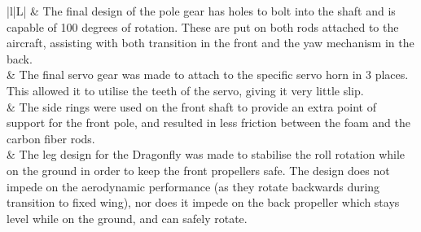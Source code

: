 \begin{table}[!htbp]
	\centering
	\caption{Gear, Legs and Front Ring Designs}
	\begin{tabulary}{\textwidth}{|l|L|}
		\hline
		\centering
		 &
		\vspace{30pt} The final design of the pole gear has holes to bolt into the shaft and is capable of 100 degrees of rotation. These are put on both rods attached to the aircraft, assisting with both transition in the front and the yaw mechanism in the back.  \\ 
		\hline 
		\centering
		 &
		\vspace{30pt} The final servo gear was made to attach to the specific servo horn in 3 places. This allowed it to utilise the teeth of the servo, giving it very little slip.\\ 
		\hline 
		\centering
		 &
		\vspace{40pt} The side rings were used on the front shaft to provide an extra point of support for the front pole, and resulted in less friction between the foam and the carbon fiber rods. \\ 
		\hline 
		\centering
		 &
		\vspace{20pt} The leg design for the Dragonfly was made to stabilise the roll rotation while on the ground in order to keep the front propellers safe. The design does not impede on the aerodynamic performance (as they rotate backwards during transition to fixed wing), nor does it impede on the back propeller which stays level while on the ground, and can safely rotate.\\ 
		\hline 
	\end{tabulary} 
	\label{tab:minor}
\end{table}